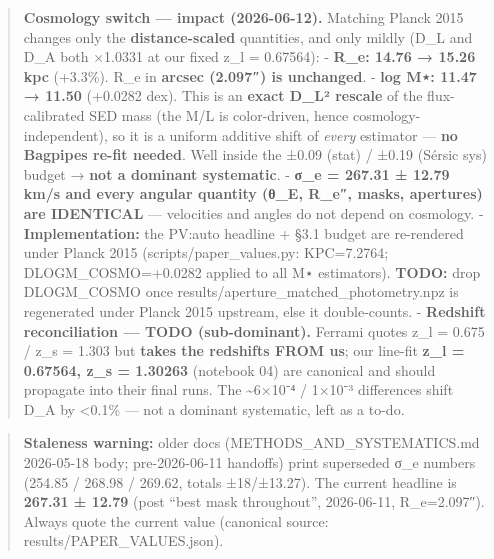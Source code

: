 \documentclass[
]{article}
\newcommand{\BreakablePath}[1]{{\ttfamily\sloppy #1}}
\begin{document}
\begin{quote}
\textbf{Cosmology switch --- impact (2026-06-12).} Matching Planck 2015
changes only the \textbf{distance-scaled} quantities, and only mildly
(D\_L and D\_A both ×1.0331 at our fixed z\_l = 0.67564): -
\textbf{R\_e: 14.76 → 15.26 kpc} (+3.3\%). R\_e in \textbf{arcsec
(2.097″) is unchanged}. - \textbf{log M⋆: 11.47 → 11.50} (+0.0282 dex).
This is an \textbf{exact D\_L² rescale} of the flux-calibrated SED mass
(the M/L is color-driven, hence cosmology-independent), so it is a
uniform additive shift of \emph{every} estimator --- \textbf{no Bagpipes
re-fit needed}. Well inside the ±0.09 (stat) / ±0.19 (Sérsic sys) budget
→ \textbf{not a dominant systematic}. - \textbf{σ\_e = 267.31 ± 12.79
km/s and every angular quantity (θ\_E, R\_e″, masks, apertures) are
IDENTICAL} --- velocities and angles do not depend on cosmology. -
\textbf{Implementation:} the PV:auto headline + §3.1 budget are
re-rendered under Planck 2015
(\BreakablePath{scripts/\discretionary{}{}{}paper\_\discretionary{}{}{}values.\discretionary{}{}{}py}:
KPC=7.2764;
\BreakablePath{DLOGM\_\discretionary{}{}{}COSMO=+0.\discretionary{}{}{}0282}
applied to all M⋆ estimators). \textbf{TODO:} drop
\BreakablePath{DLOGM\_\discretionary{}{}{}COSMO} once
\BreakablePath{results/\discretionary{}{}{}aperture\_\discretionary{}{}{}matched\_\discretionary{}{}{}photometry.\discretionary{}{}{}npz}
is regenerated under Planck 2015 upstream, else it double-counts. -
\textbf{Redshift reconciliation --- TODO (sub-dominant).} Ferrami quotes
z\_l = 0.675 / z\_s = 1.303 but \textbf{takes the redshifts FROM us};
our line-fit \textbf{z\_l = 0.67564, z\_s = 1.30263} (notebook 04) are
canonical and should propagate into their final runs. The
\textasciitilde6×10⁻⁴ / 1×10⁻³ differences shift D\_A by \textless0.1\%
--- not a dominant systematic, left as a to-do.
\end{quote}

\begin{quote}
\textbf{Staleness warning:} older docs
(\BreakablePath{METHODS\_\discretionary{}{}{}AND\_\discretionary{}{}{}SYSTEMATICS.\discretionary{}{}{}md}
2026-05-18 body; pre-2026-06-11 handoffs) print superseded σ\_e numbers
(254.85 / 268.98 / 269.62, totals ±18/±13.27). The current headline is
\textbf{267.31 ± 12.79} (post ``best mask throughout'', 2026-06-11,
R\_e=2.097″). Always quote the current value (canonical source:
\BreakablePath{results/\discretionary{}{}{}PAPER\_\discretionary{}{}{}VALUES.\discretionary{}{}{}json}).
\end{quote}
\end{document}
